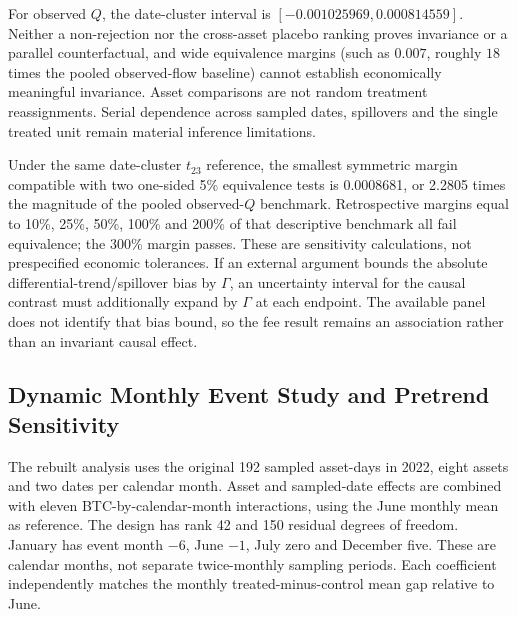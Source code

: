 \documentclass[12pt]{article}
\theoremstyle{definition}
\theoremstyle{remark}
\begin{document}
For observed $Q$, the date-cluster interval is $[-0.001025969,0.000814559]$. Neither a non-rejection nor the cross-asset placebo ranking proves invariance or a parallel counterfactual, and wide equivalence margins (such as $0.007$, roughly $18$ times the pooled observed-flow baseline) cannot establish economically meaningful invariance. Asset comparisons are not random treatment reassignments. Serial dependence across sampled dates, spillovers and the single treated unit remain material inference limitations.

Under the same date-cluster $t_{23}$ reference, the smallest symmetric margin compatible with two one-sided 5\% equivalence tests is 0.0008681, or 2.2805 times the magnitude of the pooled observed-$Q$ benchmark. Retrospective margins equal to 10\%, 25\%, 50\%, 100\% and 200\% of that descriptive benchmark all fail equivalence; the 300\% margin passes. These are sensitivity calculations, not prespecified economic tolerances. If an external argument bounds the absolute differential-trend/spillover bias by $\Gamma$, an uncertainty interval for the causal contrast must additionally expand by $\Gamma$ at each endpoint. The available panel does not identify that bias bound, so the fee result remains an association rather than an invariant causal effect.
\subsection{Dynamic Monthly Event Study and Pretrend Sensitivity}
The rebuilt analysis uses the original 192 sampled asset-days in 2022, eight assets and two dates per calendar month. Asset and sampled-date effects are combined with eleven BTC-by-calendar-month interactions, using the June monthly mean as reference. The design has rank 42 and 150 residual degrees of freedom. January has event month $-6$, June $-1$, July zero and December five. These are calendar months, not separate twice-monthly sampling periods. Each coefficient independently matches the monthly treated-minus-control mean gap relative to June.
\end{document}
